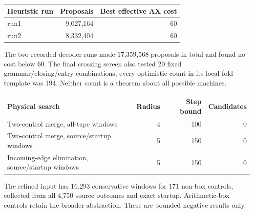 \begin{center}
\begin{tabular}{@{}lrr@{}}
\toprule Heuristic run & Proposals & Best effective AX cost\\\midrule
run1 & 9,027,164 & 60\\
run2 & 8,332,404 & 60\\
\bottomrule\end{tabular}\end{center}
The two recorded decoder runs made 17,359,568 proposals in total and found no cost below 60. The final crossing screen also tested 20 fixed grammar/closing/entry combinations; every optimistic count in its local-fold template was 194. Neither count is a theorem about all possible machines.
\begin{center}\small
\begin{tabular}{@{}lrrr@{}}
\toprule Physical search & Radius & Step bound & Candidates\\\midrule
Two-control merge, all-tape windows &4&100&0\\
Two-control merge, source/startup windows &5&150&0\\
Incoming-edge elimination, source/startup windows &5&150&0\\
\bottomrule\end{tabular}\end{center}
The refined input has 16,293 conservative windows for 171 non-box controls, collected from all 4,750 source outcomes and exact startup. Arithmetic-box controls retain the broader abstraction. These are bounded negative results only.
